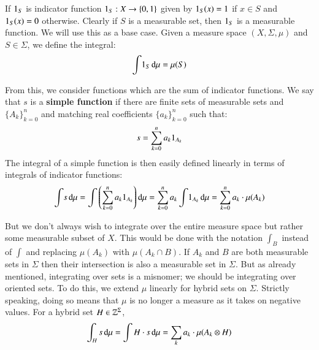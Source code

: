 If $\ind[S]$ is indicator function $\ind[S] : X \to \{ 0, 1 \}$ given by 
$\ind[S] (x) = 1$ if $x \in S$ and $\ind[S] (x) = 0$ otherwise.
Clearly if $S$ is a measurable set, then $\ind[S]$ is a measurable function.
We will use this as a base case.
Given a measure space $(X, \Sigma, \mu)$ and $S \in \Sigma$, we define the integral:
\begin{equation}
	\int \! \ind[S] \diff \mu = \mu ( S )
\end{equation}


From this, we consider functions which are the sum of indicator functions.
We say that $s$ is a \textbf{simple function} if there are finite sets of measurable sets and $\{ A_k \}_{k=0}^n$
and matching real coefficients $\{ a_k \}_{k=0}^n$ such that:
\begin{equation}
	s = \sum_{k=0}^n a_k \ind[A_k]
\end{equation}
The integral of a simple function is then easily defined linearly in terms of integrals of indicator functions:
\begin{equation}
	\int \! s \diff \mu 
		= \int \left(\sum_{k=0}^n a_k \ind[A_k] \right) \diff \mu 
		= \sum_{k=0}^n a_k  \int \! \ind[A_k] \diff \mu
		= \sum_{k=0}^n a_k \cdot \mu(A_k)
\end{equation}

But we don't always wish to integrate over the entire measure space but rather some measurable subset of $X$.
This would be done with the notation $\int_B$ instead of $\int$ and replacing $\mu(A_k)$ with $\mu(A_k \cap B)$.
If $A_k$ and $B$ are both measurable sets in $\Sigma$ then their intersection is also a measurable set in $\Sigma$.
But as already mentioned, integrating over sets is a misnomer; we should be integrating over oriented sets.
To do this, we extend $\mu$ linearly for hybrid sets on $\Sigma$.
Strictly speaking, doing so means that $\mu$ is no longer a measure as it takes on negative values.
For a hybrid set $H \in \hsetover[\Sigma]$,
\begin{equation}
	\int_H s \mathop{}\!\mathrm{d} \mu = \int H \cdot s \mathop{}\!\mathrm{d} \mu = \sum_k a_k \cdot \mu(A_k \otimes H)
\end{equation}


